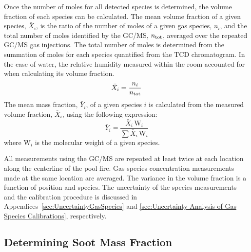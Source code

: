 \documentclass[12pt]{article}
\begin{document}
Once the number of moles for all detected species is determined, the volume fraction of each species can be calculated. The mean volume fraction of a given species, $\bar{X}_{i}$, is the ratio of the number of moles of a given gas species, $n_{i}$, and the total number of moles identified by the GC/MS, $n_{\rm tot}$, averaged over the repeated GC/MS gas injections. The total number of moles is determined from the summation of moles for each species quantified from the TCD chromatogram. In the case of water, the relative humidity measured within the room accounted for when calculating its volume fraction.
\begin{equation}\label{eq:volume_fraction}
  	\bar{X}_{i}= \frac{n_{i}}{n_{\rm tot}}
\end{equation}
The mean mass fraction, $\bar{Y}_{i}$, of a given species $i$ is calculated from the measured volume fraction, $\bar{X}_{i}$, using the following expression:
\begin{equation}\label{eq:mass_fraction}
	\bar{Y}_{i}=\frac{\bar{X}_{i} \, {\textrm{W}_{i}}}{\sum{\bar{X}_{i} \, {\textrm{W}_{i}}}}
\end{equation}
where ${{\textrm{W}_{i}}}$ is the molecular weight of a given species.

All measurements using the GC/MS are repeated at least twice at each location along the centerline of the pool fire. Gas species concentration measurements made at the same location are averaged. The variance in the volume fraction is a function of position and species. The uncertainty of the species measurements and the calibration procedure is discussed in Appendices~\ref{sec:UncertaintyGasSpecies} and \ref{sec:Uncertainty Analysis of Gas Species Calibrations}, respectively.

\subsection{Determining Soot Mass Fraction}
\label{ssec:Soot_Setup}
\end{document}
